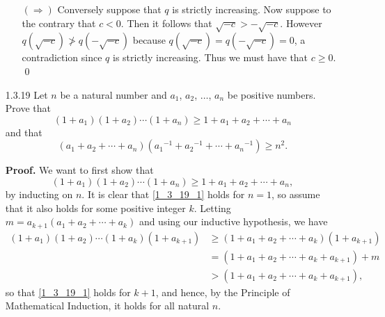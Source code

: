 \begin{enumerate}
\begin{enumerate}
               $(\Rightarrow)$ Conversely suppose that $q$ is strictly
               increasing. Now suppose to the contrary that $c < 0$. Then it
               follows that $\sqrt{-c} > -\sqrt{-c}$. However
               $q(\sqrt{-c}) \not> q(-\sqrt{-c})$ because
               $q(\sqrt{-c}) = q(-\sqrt{-c}) = 0$, a contradiction since $q$ is
               strictly increasing. Thus we must have that $c \ge 0$. \qed
      \end{enumerate}
   \item[1.3.19]  Let $n$ be a natural number and $a_1$, $a_2$, $\ldots$, $a_n$
                  be positive numbers. Prove that
                  $$(1 + a_1)(1 + a_2)\cdots(1 + a_n) \ge
                     1 + a_1 + a_2 + \cdots + a_n$$
                  and that
                  $$(a_1 + a_2 + \cdots + a_n)({a_1}^{-1} + {a_2}^{-1} + \cdots
                     + {a_n}^{-1}) \ge n^2.$$

      \textbf{Proof.} We want to first show that
      \begin{equation}
         (1 + a_1)(1 + a_2)\cdots(1 + a_n) \ge
          1 + a_1 + a_2 + \cdots + a_n, \label{1_3_19_1}
      \end{equation}
      by inducting on $n$. It is clear that \eqref{1_3_19_1} holds for $n = 1$,
      so assume that it also holds for some positive integer $k$. Letting
      $m = a_{k + 1}(a_1 + a_2 + \cdots + a_k)$ and using our inductive 
      hypothesis, we have
      \begin{align*}
         (1 + a_1)(1 + a_2)\cdots(1 + a_k)(1 + a_{k + 1})
            &\ge (1 + a_1 + a_2 + \cdots + a_k)(1 + a_{k + 1}) \\
            &= (1 + a_1 + a_2 + \cdots + a_k + a_{k + 1}) + m \\
            &> (1 + a_1 + a_2 + \cdots + a_k + a_{k + 1}), 
      \end{align*}
      so that \eqref{1_3_19_1} holds for $k + 1$, and hence, by the Principle of
      Mathematical Induction, it holds for all natural $n$.


\end{enumerate}
